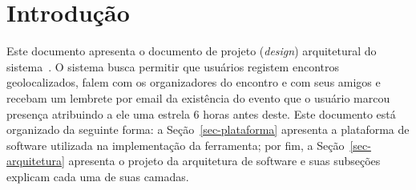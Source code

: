\chapter{Introdução}
\label{sec-intro}

Este documento apresenta o documento de projeto (\textit{design}) arquitetural do sistema~\imprimirtitulo. O sistema busca permitir que usuários registem encontros geolocalizados, falem com os organizadores do encontro e com seus amigos e recebam um lembrete por email da existência do evento que o usuário marcou presença atribuindo a ele uma estrela 6 horas antes deste. Este documento está organizado da seguinte forma: a Seção~\ref{sec-plataforma} apresenta a plataforma de software utilizada na implementação da ferramenta; por fim, a Seção~\ref{sec-arquitetura} apresenta o projeto da arquitetura de software e suas subseções explicam cada uma de suas camadas.
